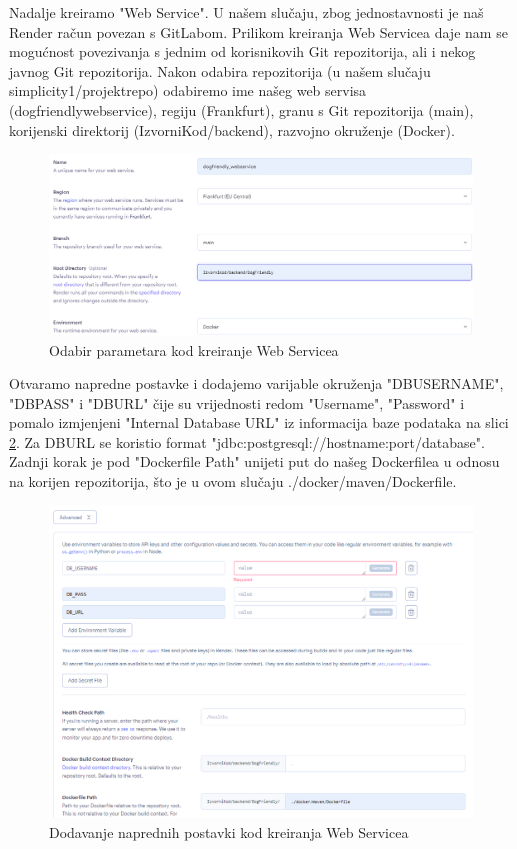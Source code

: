             Nadalje kreiramo "Web Service". U našem slučaju, zbog jednostavnosti je naš Render račun povezan s GitLabom. Prilikom kreiranja Web Servicea daje nam se mogućnost povezivanja s jednim od korisnikovih Git repozitorija, ali i nekog javnog Git repozitorija. Nakon odabira repozitorija (u našem slučaju simplicity1/projektrepo) odabiremo ime našeg web servisa (dogfriendly\textunderscore webservice), regiju (Frankfurt), granu s Git repozitorija (main), korijenski direktorij (IzvorniKod/backend), razvojno okruženje (Docker).
            \begin{figure}[H]
			    \includegraphics[width=\textwidth]{slike/deploy5.png} 
			        \caption{Odabir parametara kod kreiranje Web Servicea}
			    \label{fig:Odabir parametara kod kreiranje Web Servicea}
		    \end{figure}
            Otvaramo napredne postavke i dodajemo varijable okruženja "DB\textunderscore USERNAME", "DB\textunderscore PASS" i "DB\textunderscore URL" čije su vrijednosti redom "Username", "Password" i pomalo izmjenjeni "Internal Database URL" iz informacija baze podataka na slici \ref{fig:Dodavanje naprednih postavki kod kreiranja Web Servicea}. Za DB\textunderscore URL se koristio format "jdbc:postgresql://hostname:port/database". Zadnji korak je pod "Dockerfile Path" unijeti put do našeg Dockerfilea u odnosu na korijen repozitorija, što je u ovom slučaju ./docker/maven/Dockerfile.
            \begin{figure}[H]
			    \includegraphics[width=\textwidth]{slike/deploy6.png} 
			        \caption{Dodavanje naprednih postavki kod kreiranja Web Servicea}
			    \label{fig:Dodavanje naprednih postavki kod kreiranja Web Servicea}
		    \end{figure}
